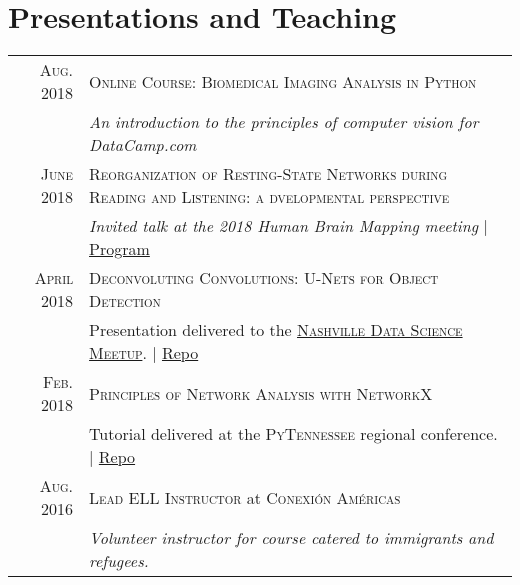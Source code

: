 \documentclass[a4paper,10pt]{article}
\begin{document}
\section{Presentations and Teaching}
\begin{longtable}{rp{11cm}}
    \textsc{Aug.} 2018 & \textsc{Online Course: Biomedical Imaging Analysis in Python} \\
    & \emph{An introduction to the principles of computer vision for DataCamp.com} \smallskip \\

    \textsc{June} 2018 & \textsc{Reorganization of Resting-State Networks during Reading and Listening: a dvelopmental perspective} \\
    & \emph{Invited talk at the 2018 Human Brain Mapping meeting} | \href{https://www.humanbrainmapping.org/files/2018/Oral\%20Session/Language.pdf}{Program} \smallskip \\

    \textsc{April} 2018 & \textsc{Deconvoluting Convolutions: U-Nets for Object Detection}\\
    & Presentation delivered to the \href{https://www.meetup.com/Data-Science-Nashville/events/249853957/}{\textsc{Nashville Data Science Meetup}}. | \href{https://github.com/stkbailey/deconv-conv)}{Repo} \smallskip \\

    \textsc{Feb.} 2018 & \textsc{Principles of Network Analysis with NetworkX}\\
    & Tutorial delivered at the \textsc{PyTennessee} regional conference. | \href{https://github.com/stkbailey/nashnetx/presentations}{Repo}  \smallskip\\

    \textsc{Aug. 2016} & \textsc{Lead ELL Instructor} at \textsc{Conexi\'on Am\'ericas} \\
    & \emph{Volunteer instructor for course catered to immigrants and refugees.} \\ 
\end{longtable}
\end{document}
